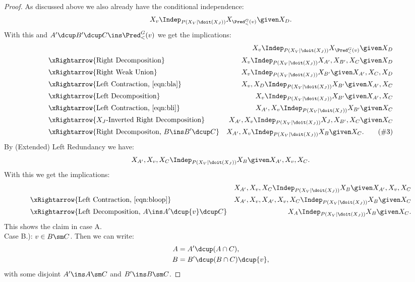 \begin{Thm}
\begin{proof}
As discussed above we also already have the conditional independence:
\[ X_v \Indep_{P(X_V|\doit(X_J))}  X_{\Pred^G_<(v)} \given X_D. \]
With this and $A' \dcup B' \dcup C \ins \Pred^G_<(v)$ we get the implications:
\begin{align*}
&&X_v \Indep_{P(X_V|\doit(X_J))}  X_{\Pred^G_<(v)} \given X_D\\ 
&\xRightarrow{\text{Right Decomposition}} & 
X_v \Indep_{P(X_V|\doit(X_J))}  X_{A'}, X_{B'}, X_C \given X_D \\
& \xRightarrow{\text{Right Weak Union}}  & 
X_v \Indep_{P(X_V|\doit(X_J))} X_{B'} \given X_{A'}, X_C, X_D \\ 
& \xRightarrow{\text{Left Contraction, }\eqref{eqn:bla}}  & X_v, X_D  \Indep_{P(X_V|\doit(X_J))}  X_{B'} \given X_{A'}, X_C \\
& \xRightarrow{\text{Left Decomposition}}  & X_v \Indep_{P(X_V|\doit(X_J))}  X_{B'} \given X_{A'}, X_C\\
& \xRightarrow{\text{Left Contraction, } \eqref{eqn:bli}}  &  X_{A'},X_v \Indep_{P(X_V|\doit(X_J))}  X_{B'} \given X_C\\
& \xRightarrow{X_J\text{-Inverted Right Decomposition}}  & X_{A'}, X_v \Indep_{P(X_V|\doit(X_J))}  X_J,X_{B'},X_C \given X_C\\
& \xRightarrow{\text{Right Decompositon, } B \ins B' \dcup C}  & X_{A'}, X_v \Indep_{P(X_V|\doit(X_J))}  X_B \given X_C.
 \label{eqn:bloop} \tag{\#3}
\end{align*}
By (Extended) Left Redundancy we have:
\[ X_{A'},X_v, X_C \Indep_{P(X_V|\doit(X_J))}  X_B \given X_{A'},X_v,X_C. \]
With this we get the implications:
\begin{align*}
&&X_{A'},X_v, X_C \Indep_{P(X_V|\doit(X_J))}  X_B \given X_{A'},X_v,X_C\\
& \xRightarrow{\text{Left Contraction, } \eqref{eqn:bloop}}  &  
X_{A'},X_v,X_{A'},X_v, X_C \Indep_{P(X_V|\doit(X_J))}  X_B \given X_C\\
& \xRightarrow{\text{Left Decomposition, } A \ins A' \dcup \{v\} \dcup C}  &    
X_A \Indep_{P(X_V|\doit(X_J))}  X_B \given X_C. 
\end{align*}
This shows the claim in case A.\\

%
Case B.):  $v \in B\sm C$. Then we can write:
\begin{align*}
    A &= A' \dcup (A \cap C), \\
    B &= B' \dcup (B \cap C) \dcup \{v\},
\end{align*}
with some disjoint $A' \ins A \sm C$ and $B' \ins B \sm C$.


\end{proof}
\end{Thm}

